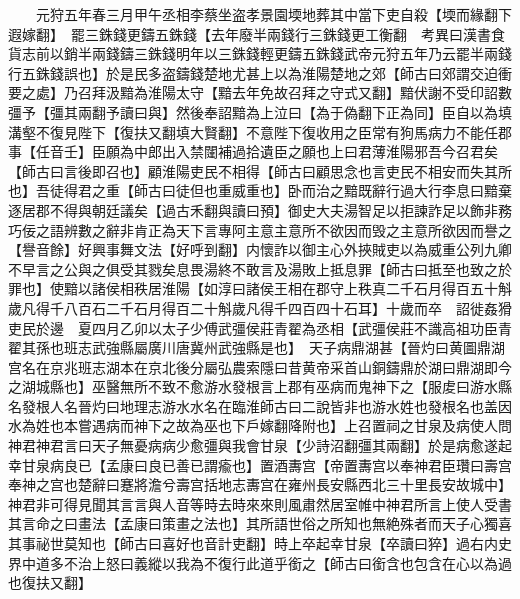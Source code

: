 　　元狩五年春三月甲午丞相李蔡坐盗孝景園堧地葬其中當下吏自殺【堧而緣翻下遐嫁翻】　罷三銖錢更鑄五銖錢【去年廢半兩錢行三銖錢更工衡翻　考異曰漢書食貨志前以銷半兩錢鑄三銖錢明年以三銖錢輕更鑄五銖錢武帝元狩五年乃云罷半兩錢行五銖錢誤也】於是民多盗鑄錢楚地尤甚上以為淮陽楚地之郊【師古曰郊謂交迫衝要之處】乃召拜汲黯為淮陽太守【黯去年免故召拜之守式又翻】黯伏謝不受印詔數彊予【彊其兩翻予讀曰與】然後奉詔黯為上泣曰【為于偽翻下正為同】臣自以為填溝壑不復見陛下【復扶又翻填大賢翻】不意陛下復收用之臣常有狗馬病力不能任郡事【任音壬】臣願為中郎出入禁闥補過拾遺臣之願也上曰君薄淮陽邪吾今召君矣【師古曰言後即召也】顧淮陽吏民不相得【師古曰顧思念也言吏民不相安而失其所也】吾徒得君之重【師古曰徒但也重威重也】卧而治之黯既辭行過大行李息曰黯棄逐居郡不得與朝廷議矣【過古禾翻與讀曰預】御史大夫湯智足以拒諫詐足以飾非務巧佞之語辨數之辭非肯正為天下言專阿主意主意所不欲因而毁之主意所欲因而譽之【譽音餘】好興事舞文法【好呼到翻】内懷詐以御主心外挾賊吏以為威重公列九卿不早言之公與之俱受其戮矣息畏湯終不敢言及湯敗上抵息罪【師古曰抵至也致之於罪也】使黯以諸侯相秩居淮陽【如淳曰諸侯王相在郡守上秩真二千石月得百五十斛歲凡得千八百石二千石月得百二十斛歲凡得千四百四十石耳】十歲而卒　詔徙姦猾吏民於邊　夏四月乙卯以太子少傅武彊侯莊青翟為丞相【武彊侯莊不識高祖功臣青翟其孫也班志武強縣屬廣川唐冀州武強縣是也】　天子病鼎湖甚【晉灼曰黄圖鼎湖宫名在京兆班志湖本在京北後分屬弘農索隱曰昔黄帝采首山銅鑄鼎於湖曰鼎湖即今之湖城縣也】巫醫無所不致不愈游水發根言上郡有巫病而鬼神下之【服䖍曰游水縣名發根人名晉灼曰地理志游水水名在臨淮師古曰二說皆非也游水姓也發根名也盖因水為姓也本嘗遇病而神下之故為巫也下戶嫁翻降附也】上召置祠之甘泉及病使人問神君神君言曰天子無憂病病少愈彊與我會甘泉【少詩沼翻彊其兩翻】於是病愈遂起幸甘泉病良已【孟康曰良已善已謂瘉也】置酒夀宫【帝置夀宫以奉神君臣瓚曰壽宫奉神之宫也楚辭曰蹇將澹兮壽宫括地志夀宫在雍州長安縣西北三十里長安故城中】神君非可得見聞其言言與人音等時去時來來則風肅然居室帷中神君所言上使人受書其言命之曰畫法【孟康曰策畫之法也】其所語世俗之所知也無絶殊者而天子心獨喜其事祕世莫知也【師古曰喜好也音計吏翻】時上卒起幸甘泉【卒讀曰猝】過右内史界中道多不治上怒曰義縱以我為不復行此道乎銜之【師古曰銜含也包含在心以為過也復扶又翻】

